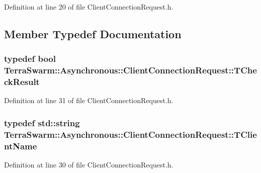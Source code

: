 Definition at line 20 of file Client\-Connection\-Request.\-h.



\subsection{Member Typedef Documentation}
\hypertarget{class_terra_swarm_1_1_asynchronous_1_1_client_connection_request_a5c46a6a486f1f74b413e11b919b44d4f}{
\subsubsection[{T\-Check\-Result}]{\setlength{\rightskip}{0pt plus 5cm}typedef bool {\bf Terra\-Swarm\-::\-Asynchronous\-::\-Client\-Connection\-Request\-::\-T\-Check\-Result}}}\label{class_terra_swarm_1_1_asynchronous_1_1_client_connection_request_a5c46a6a486f1f74b413e11b919b44d4f}


Definition at line 31 of file Client\-Connection\-Request.\-h.

\hypertarget{class_terra_swarm_1_1_asynchronous_1_1_client_connection_request_a50a16fcfef8eb10d5191b6eaf0723a92}{
\subsubsection[{T\-Client\-Name}]{\setlength{\rightskip}{0pt plus 5cm}typedef std\-::string {\bf Terra\-Swarm\-::\-Asynchronous\-::\-Client\-Connection\-Request\-::\-T\-Client\-Name}}}\label{class_terra_swarm_1_1_asynchronous_1_1_client_connection_request_a50a16fcfef8eb10d5191b6eaf0723a92}


Definition at line 30 of file Client\-Connection\-Request.\-h.



